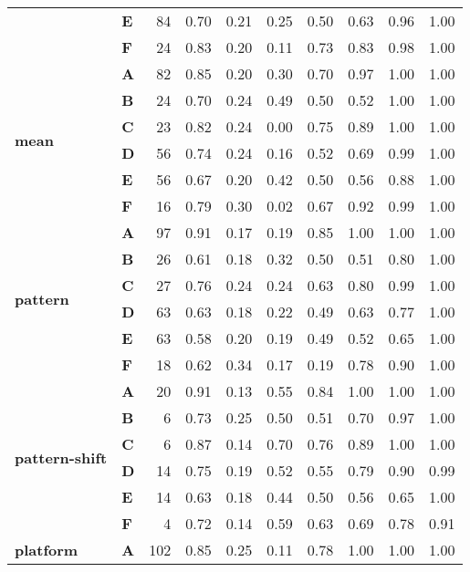 \begin{table}
\begin{tabular}{llrrrrrrrr}
\textbf{} & \textbf{E} & 84 & 0.70 & 0.21 & 0.25 & 0.50 & 0.63 & 0.96 & 1.00 \\
\textbf{} & \textbf{F} & 24 & 0.83 & 0.20 & 0.11 & 0.73 & 0.83 & 0.98 & 1.00 \\
\cline{1-10}
\multirow[t]{6}{*}{\textbf{mean}} & \textbf{A} & 82 & 0.85 & 0.20 & 0.30 & 0.70 & 0.97 & 1.00 & 1.00 \\
\textbf{} & \textbf{B} & 24 & 0.70 & 0.24 & 0.49 & 0.50 & 0.52 & 1.00 & 1.00 \\
\textbf{} & \textbf{C} & 23 & 0.82 & 0.24 & 0.00 & 0.75 & 0.89 & 1.00 & 1.00 \\
\textbf{} & \textbf{D} & 56 & 0.74 & 0.24 & 0.16 & 0.52 & 0.69 & 0.99 & 1.00 \\
\textbf{} & \textbf{E} & 56 & 0.67 & 0.20 & 0.42 & 0.50 & 0.56 & 0.88 & 1.00 \\
\textbf{} & \textbf{F} & 16 & 0.79 & 0.30 & 0.02 & 0.67 & 0.92 & 0.99 & 1.00 \\
\cline{1-10}
\multirow[t]{6}{*}{\textbf{pattern}} & \textbf{A} & 97 & 0.91 & 0.17 & 0.19 & 0.85 & 1.00 & 1.00 & 1.00 \\
\textbf{} & \textbf{B} & 26 & 0.61 & 0.18 & 0.32 & 0.50 & 0.51 & 0.80 & 1.00 \\
\textbf{} & \textbf{C} & 27 & 0.76 & 0.24 & 0.24 & 0.63 & 0.80 & 0.99 & 1.00 \\
\textbf{} & \textbf{D} & 63 & 0.63 & 0.18 & 0.22 & 0.49 & 0.63 & 0.77 & 1.00 \\
\textbf{} & \textbf{E} & 63 & 0.58 & 0.20 & 0.19 & 0.49 & 0.52 & 0.65 & 1.00 \\
\textbf{} & \textbf{F} & 18 & 0.62 & 0.34 & 0.17 & 0.19 & 0.78 & 0.90 & 1.00 \\
\cline{1-10}
\multirow[t]{6}{*}{\textbf{pattern-shift}} & \textbf{A} & 20 & 0.91 & 0.13 & 0.55 & 0.84 & 1.00 & 1.00 & 1.00 \\
\textbf{} & \textbf{B} & 6 & 0.73 & 0.25 & 0.50 & 0.51 & 0.70 & 0.97 & 1.00 \\
\textbf{} & \textbf{C} & 6 & 0.87 & 0.14 & 0.70 & 0.76 & 0.89 & 1.00 & 1.00 \\
\textbf{} & \textbf{D} & 14 & 0.75 & 0.19 & 0.52 & 0.55 & 0.79 & 0.90 & 0.99 \\
\textbf{} & \textbf{E} & 14 & 0.63 & 0.18 & 0.44 & 0.50 & 0.56 & 0.65 & 1.00 \\
\textbf{} & \textbf{F} & 4 & 0.72 & 0.14 & 0.59 & 0.63 & 0.69 & 0.78 & 0.91 \\
\cline{1-10}
\multirow[t]{6}{*}{\textbf{platform}} & \textbf{A} & 102 & 0.85 & 0.25 & 0.11 & 0.78 & 1.00 & 1.00 & 1.00 \\

\end{tabular}
\end{table}
